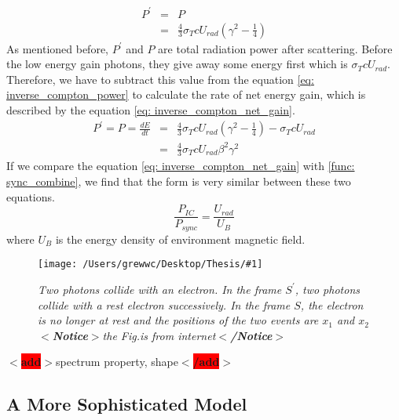 \documentclass[12pt]{report}
\newcommand{\mycaption}[1]{\caption{\textit{\footnotesize #1}}}
\newcommand{\singleFig}[3]{
 \begin{figure}[!ht]
  \centering
  \texttt{[image: /Users/grewwc/Desktop/Thesis/\#1]}
  \mycaption{#3}
 \label{fig: #1}
 \end{figure}
}
\newcommand{\add}[1]{
  $<$\colorbox{red}{\textbf{add}}$>$#1$<$\colorbox{red}{\textbf{/add}}$>$
}
\newcommand{\Notice}[1]{
  $<$\textbf{Notice}$>$#1$<$\textbf{/Notice}$>$
}
\begin{document}
          \begin{eqnarray}
            \label{eq: inverse_compton_power}
            P^{\prime} &=& P  \nonumber \\
                       &=& \frac{4}{3} \sigma_{T} c U_{rad} \left(\gamma^2 - \frac{1}{4}\right)
          \end{eqnarray}
          As mentioned before, $P^{\prime}$ and $P$ are total radiation power after scattering. Before the 
          low energy gain photons, they give away some energy first which is $\sigma_{T} c U_{rad}$. 
          Therefore, we have to subtract this value from the equation \ref{eq: inverse_compton_power} to 
          calculate the rate of net energy gain, which is described by the equation 
          \ref{eq: inverse_compton_net_gain}.
          \begin{eqnarray}
            \label{eq: inverse_compton_net_gain}
            P^{\prime} = P = \frac{dE}{dt} &=& \frac{4}{3} \sigma_{T} c U_{rad} \left(\gamma^2 - \frac{1}{4}\right) - \sigma_{T} c U_{rad} \nonumber \\
                                           &=& \frac{4}{3} \sigma_{T} c U_{rad} \beta^{2} \gamma^{2}
          \end{eqnarray}
          If we compare the equation \ref{eq: inverse_compton_net_gain} with \ref{func: sync_combine}, we 
          find that the form is very similar between these two equations. 
          \begin{equation}
            \label{eq: comparision_inverse_compton_and_sync}
            \frac{P_{IC}}{P_{sync}} = \frac{U_{rad}}{U_{B}}
          \end{equation}
          where $U_{B}$ is the energy density of environment magnetic field. 

          \vspace{1cm}
          \singleFig{inverse_compton_time_interval}{0.45}{Two photons collide with an electron. 
            In the frame $S^{\prime}$, two photons collide with a rest electron successively.
            In the frame $S$, the electron is no longer at rest and the positions of the two events 
            are $x_1$ and $x_2$ \Notice{the Fig.is from internet}}

          \add{spectrum property, shape}

        
          \subsection{A More Sophisticated Model}
\end{document}
